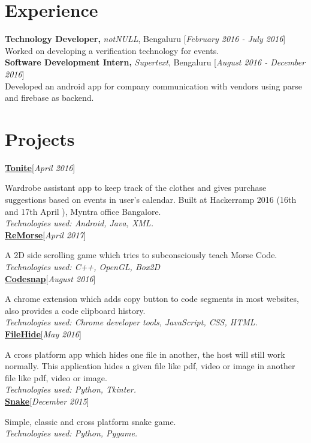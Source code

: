 \documentclass[10pt]{article}
\begin{document}
\section{Experience} \textbf{Technology Developer,} \textit{notNULL},
Bengaluru \hfill [\textit{February 2016 - July 2016}]\\
Worked on developing a verification technology for events.
\medskip
\\
\textbf{Software Development Intern,} \textit{Supertext}, Bengaluru
\hfill [\textit{August 2016 - December 2016}]\\
Developed an android app for company communication with vendors using
parse and firebase as backend. 

\section{Projects}

\textbf{\underline{\large\href{https://github.com/abhijith0505/Tonite}
{Tonite}}}\hfill[\textit{April 2016}]
\par
Wardrobe assistant app to keep track of the clothes and gives purchase
suggestions based on events in user's calendar.  Built at Hackerramp
2016 (16th and 17th April ), Myntra office Bangalore.\\
\textit{Technologies used:  Android, Java, XML.}
\smallskip
\\
\textbf{\underline{\large\href{https://github.com/RaghavaDhanya/ReMorse}
{ReMorse}}}\hfill[\textit{April 2017}]
\par
A 2D side scrolling game which tries to subconsciously teach Morse Code.\\
\textit{Technologies used:  C++, OpenGL, Box2D}
\smallskip
\\
\textbf{\underline{\large\href{https://github.com/RaghavaDhanya/Codesnap}
{Codesnap}}}\hfill[\textit{August 2016}]
\par
A chrome extension which adds copy button to code segments in most
websites, also provides a code clipboard history.\\
\textit{Technologies used:  Chrome developer tools, JavaScript, CSS,
HTML.  }
\smallskip
\\
\textbf{\underline{\large\href{https://github.com/RaghavaDhanya/FileHide}
{FileHide}}}\hfill[\textit{May 2016}]
\par
A cross platform app which hides one file in another, the host will
still work normally.  This application hides a given file like pdf,
video or image in another file like pdf, video or image.\\
\textit{Technologies used:  Python, Tkinter.}
\smallskip
\\
\textbf{\underline{\large\href{https://github.com/RaghavaDhanya/Snake}
{Snake}}}\hfill[\textit{December 2015}]
\par
Simple, classic and cross platform snake game.\\
\textit{Technologies used:  Python, Pygame.} 
\end{document}
